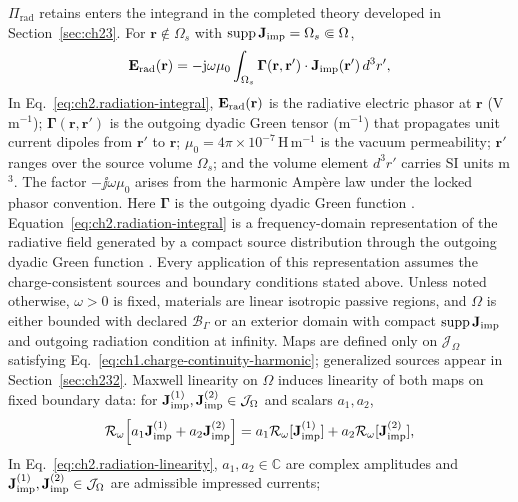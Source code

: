 \(\Pi_{\mathrm{rad}}\) retains enters the integrand in the completed theory developed in
Section~\ref{sec:ch23}. For \(\mathbf{r}\notin\Omega_s\) with
\(\operatorname{supp}\mathbf{J}_{\mathrm{imp}}=\Omega_s\Subset\Omega\),
\begin{equation}
\label{eq:ch2.radiation-integral}
\mathbf{E}_{\mathrm{rad}}(\mathbf{r})
=
-\mathrm{j}\omega\mu_0
\int_{\Omega_s}
\boldsymbol{\Gamma}(\mathbf{r},\mathbf{r}')\cdot\mathbf{J}_{\mathrm{imp}}(\mathbf{r}')\,d^{3}r',
\end{equation}
In Eq.~\eqref{eq:ch2.radiation-integral},
\(\mathbf{E}_{\mathrm{rad}}(\mathbf{r})\) is the radiative electric phasor at
\(\mathbf{r}\) (V\,m\(^{-1}\));
\(\boldsymbol{\Gamma}(\mathbf{r},\mathbf{r}')\) is the outgoing dyadic Green tensor
(m\(^{-1}\)) that propagates unit current dipoles from \(\mathbf{r}'\) to
\(\mathbf{r}\);
\(\mu_0=4\pi\times 10^{-7}\,\mathrm{H\,m^{-1}}\) is the vacuum permeability;
\(\mathbf{r}'\) ranges over the source volume \(\Omega_s\); and the volume element
\(d^{3}r'\) carries SI units m\(^{3}\).
The factor \(-\jj\omega\mu_0\) arises from the harmonic Amp\`ere law under the
locked phasor convention.
Here \(\boldsymbol{\Gamma}\) is the outgoing dyadic Green function
\cite{stratton1941}. Equation~\eqref{eq:ch2.radiation-integral} is a
frequency-domain representation of the radiative field generated by a compact source
distribution through the outgoing dyadic Green function \cite{stratton1941}.
Every application of this representation assumes the charge-consistent sources and boundary conditions
stated above. Unless noted otherwise, \(\omega>0\) is fixed,
materials are linear isotropic passive regions, and \(\Omega\) is either bounded
with declared \(\mathcal{B}_\Gamma\) or an exterior domain with compact
\(\operatorname{supp}\mathbf{J}_{\mathrm{imp}}\) and outgoing radiation condition at infinity. Maps are defined
only on \(\mathcal{J}_\Omega\) satisfying Eq.~\eqref{eq:ch1.charge-continuity-harmonic};
generalized sources appear in Section~\ref{sec:ch232}. Maxwell linearity on \(\Omega\) induces linearity of both maps on fixed boundary
data: for \(\mathbf{J}_{\mathrm{imp}}^{(1)},\mathbf{J}_{\mathrm{imp}}^{(2)}\in\mathcal{J}_\Omega\) and scalars \(a_{1},a_{2}\),
\begin{equation}
\label{eq:ch2.radiation-linearity}
\mathcal{R}_\omega\!\left[a_{1}\mathbf{J}_{\mathrm{imp}}^{(1)}+a_{2}\mathbf{J}_{\mathrm{imp}}^{(2)}\right]
=
a_{1}\mathcal{R}_\omega[\mathbf{J}_{\mathrm{imp}}^{(1)}]
+a_{2}\mathcal{R}_\omega[\mathbf{J}_{\mathrm{imp}}^{(2)}],
\end{equation}
In Eq.~\eqref{eq:ch2.radiation-linearity},
\(a_1,a_2\in\mathbb{C}\) are complex amplitudes and
\(\mathbf{J}_{\mathrm{imp}}^{(1)},\mathbf{J}_{\mathrm{imp}}^{(2)}\in\mathcal{J}_\Omega\) are admissible impressed currents;
